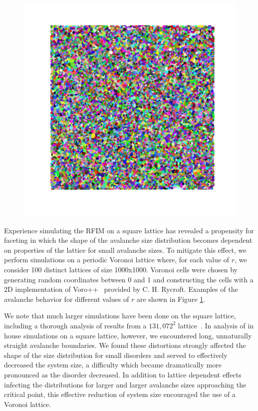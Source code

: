 \documentclass[reprint,amsmath,amssymb,aps,floatfix]{revtex4-1}
\begin{document}
\begin{figure}[!b]
  	\includegraphics[scale=0.08]{avalanche_image_size1000000_seed50050_r50pt0.png}
  	\label{fig:avalanches}
\end{figure}
%
Experience simulating the RFIM on a square lattice has revealed a propensity for faceting in which the shape of the avalanche size distribution becomes dependent on properties of the lattice for small avalanche sizes.  To mitigate this effect, we perform simulations on a periodic Voronoi lattice where, for each value of $r$, we consider 100 distinct lattices of size 1000x1000.  Voronoi cells were chosen by generating random coordinates between 0 and 1 and constructing the cells with a 2D implementation of Voro++~\cite{Rycroft09} provided by C. H. Rycroft.  Examples of the avalanche behavior for different values of $r$ are shown in Figure \ref{fig:avalanches}. \par
%
We note that much larger simulations have been done on the square lattice, including a thorough analysis of results from a  $131,072^2$ lattice~\cite{Spasojevic11,Spasojevic11-2}. In analysis of in house simulations on a square lattice, however, we encountered long, unnaturally straight avalanche boundaries. We found these distortions strongly affected the shape of the size distribution for small disorders and served to effectively decreased the system size, a difficulty which became dramatically more pronounced as the disorder decreased. In addition to lattice dependent effects infecting the distributions for larger and larger avalanche sizes approaching the critical point, this effective reduction of system size encouraged the use of a Voronoi lattice. \par
\end{document}

